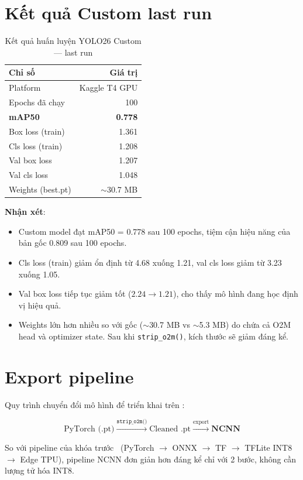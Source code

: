 \section{Kết quả Custom last run}
\label{sec:results_custom}

\begin{table}[H]
    \centering
    \caption{Kết quả huấn luyện YOLO26 Custom --- last run}
    \label{tab:results_custom}
    \begin{tabular}{lr}
        \toprule
        \textbf{Chỉ số} & \textbf{Giá trị} \\
        \midrule
        Platform             & Kaggle T4 GPU \\
        Epochs đã chạy       & 100 \\
        \textbf{mAP50}       & \textbf{0.778} \\
        Box loss (train)     & 1.361 \\
        Cls loss (train)     & 1.208 \\
        Val box loss         & 1.207 \\
        Val cls loss         & 1.048 \\
        Weights (best.pt)    & $\sim$30.7 MB \\
        \bottomrule
    \end{tabular}
\end{table}

\textbf{Nhận xét}:
\begin{itemize}
    \item Custom model đạt mAP50 = 0.778 sau 100 epochs, tiệm cận hiệu năng của bản gốc 0.809 sau 100 epochs.
    \item Cls loss (train) giảm ổn định từ 4.68 xuống 1.21, val cls loss giảm từ 3.23 xuống 1.05.
    \item Val box loss tiếp tục giảm tốt ($2.24 \to 1.21$), cho thấy mô hình đang học định vị hiệu quả.
    \item Weights lớn hơn nhiều so với gốc ($\sim$30.7 MB vs $\sim$5.3 MB) do chứa cả O2M head và optimizer state. Sau khi \texttt{strip\_o2m()}, kích thước sẽ giảm đáng kể.
\end{itemize}

\section{Export pipeline}
\label{sec:train_export}

Quy trình chuyển đổi mô hình để triển khai trên \rpi:

\begin{equation*}
    \text{PyTorch (.pt)} \xrightarrow{\texttt{strip\_o2m()}} \text{Cleaned .pt} \xrightarrow{\text{export}} \textbf{NCNN}
\end{equation*}

So với pipeline của khóa trước~\cite{kltn_tiennhiem} (PyTorch $\to$ ONNX $\to$ TF $\to$ TFLite INT8 $\to$ Edge TPU), pipeline NCNN đơn giản hơn đáng kể chỉ với 2 bước, không cần lượng tử hóa INT8.
